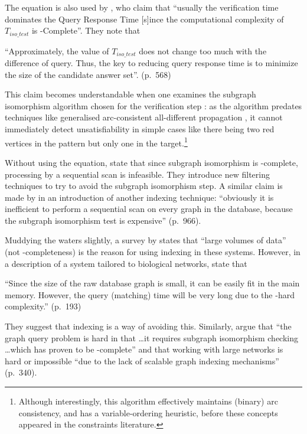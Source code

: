 \documentclass[twoside,11pt]{article}
\begin{document}
The equation is also used by , who claim that ``usually the
verification time dominates the Query Response Time [s]ince the computational complexity of
$T_{\mathit{iso\_test}}$ is \NP-Complete''. They note that \begin{displayquote}``Approximately, the
    value of $T_{\mathit{iso\_test}}$ does not change too much with the difference of query. Thus,
the key to reducing query response time is to minimize the size of the candidate answer
set''.  (p.\ 568)\end{displayquote} This claim becomes understandable when one examines the subgraph
isomorphism algorithm chosen for the verification step \cite{DBLP:journals/jacm/Ullmann76}: as the
algorithm predates techniques like generalised arc-consistent all-different propagation
\cite{DBLP:conf/aaai/Regin94}, it cannot immediately detect unsatisfiability in simple cases like
there being two red vertices in the pattern but only one in the target.\footnote{Although
interestingly, this algorithm effectively maintains (binary) arc consistency, and has a
variable-ordering heuristic, before these concepts appeared in the constraints literature.}

Without using the equation,  state that since subgraph
isomorphism is \NP-complete, processing by a sequential scan is infeasible. They introduce new
filtering techniques to try to avoid the subgraph isomorphism step. A similar claim is made by
 in an introduction of another indexing technique: ``obviously it is
inefficient to perform a sequential scan on every graph in the database, because the subgraph
isomorphism test is expensive'' (p.\ 966).

Muddying the waters slightly, a survey by  states that
``large volumes of data'' (not \NP-completeness) is the reason for using indexing in these systems.
However, in a description of a system tailored to biological networks,
 state that \begin{displayquote}``Since the size of the raw database
    graph is small, it can be easily fit in the main memory.  However, the query (matching) time
will be very long due to the \NP-hard complexity.'' (p.\ 193)\end{displayquote} They suggest that
indexing is a way of avoiding this. Similarly,  argue that ``the
graph query problem is hard in that \ldots it requires subgraph isomorphism checking \ldots which
has proven to be \NP-complete'' and that working with large networks is hard or impossible ``due to
the lack of scalable graph indexing mechanisms'' (p.\ 340).
\end{document}
